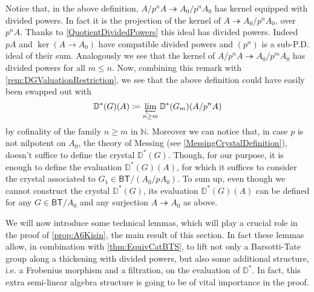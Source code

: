 \begin{rem}[]\label{rem:NonNilpotentCrystalEvaluation}
	Notice that, in the above definition, $A/p^nA \twoheadrightarrow A_0/p^nA_0$
	has kernel equipped with divided powers.
	In fact it is the projection of the kernel of $A \twoheadrightarrow A_0/p^nA_0$, over
	$p^nA$.
	Thanks to \cref{QuotientDividedPowers} this ideal has divided powers.
	Indeed $pA$ and $\ker (A \to A_0)$ have compatible
	divided powers and \((p^n)\) is a sub-P.D. ideal of their sum.
	Analogously we see that the kernel of $A/p^nA \twoheadrightarrow A_0/p^mA_0$
	has divided powers for all $m \leq n$.
	Now, combining this remark with \cref{rem:DGValuationRestriction},
	we see that the above definition could have easily been swapped out with
	\begin{equation*}
		\mathbb{D}^*(G)(A) \coloneqq
		\varprojlim_{n \geq m} \mathbb{D}^*(G_m)(A/p^nA)
	\end{equation*}
	by cofinality of the family $n \geq m$ in $\mathbb{N}$.
	Moreover we can notice that, in case $p$ is not nilpotent
	on $A_0$, the theory of Messing (see \cref{MessingCrystalDefinition}),
	doesn't suffice to define the crystal $\mathbb{D}^*(G)$.
	Though, for our purpose, it is enough to define the evaluation $\mathbb{D}^*(G)(A)$,
	for which it suffices to consider the crystal associated to $G_1 \in \mathsf{BT}/ (A_0/pA_0)$.
	To sum up, even though we cannot construct the crystal
	\(\mathbb{D}^*(G)\), its evaluation \(\mathbb{D}^*(G)(A)\)
	can be defined for any $G \in \mathsf{BT}/A_0$ and any surjection
	$A \twoheadrightarrow A_0$ as above.
\end{rem}


\begin{rem}[]
	We will now introduce some technical lemmas, which will play a crucial role
	in the proof of \cref{prop:A6Kisin},
	the main result of this section.
	In fact these lemmas allow, in combination with \cref{thm:EquivCatBTS},
	to lift not only a Barsotti-Tate group along a thickening with divided
	powers, but also some additional structure, i.e.
	a Frobenius morphism and a filtration, on the evaluation of $\mathbb{D}^*$.
	In fact, this extra semi-linear algebra structure is going to 
	be of vital importance in the proof.
\end{rem}



